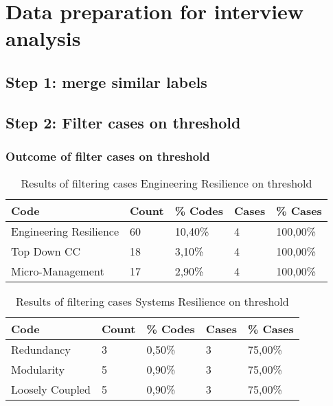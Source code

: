\chapter{Data preparation for interview analysis}

\section{Step 1: merge similar labels}


\section{Step 2: Filter cases on threshold}



\subsection{Outcome of filter cases on threshold}

\begin{table}[H]
	\centering
	\begin{tabular}{lllll}
		\toprule
		\textbf{Code} & \textbf{Count} & \textbf{\% Codes} &\textbf{Cases} & \textbf{\% Cases} \\
		\midrule
		Engineering Resilience & 60    & 10,40\% & 4     & 100,00\% \\
		Top Down CC & 18    & 3,10\% & 4     & 100,00\% \\
		Micro-Management & 17    & 2,90\% & 4     & 100,00\% \\
		\bottomrule
	\end{tabular}%
	\caption{Results of filtering cases Engineering Resilience on threshold}%
	\label{tab:resultsfilteringengineeringresilience}%
\end{table}%

\begin{table}[H]
	\centering
	\begin{tabular}{lllll}
		\toprule
		\textbf{Code} & \textbf{Count} & \textbf{\% Codes} &\textbf{Cases} & \textbf{\% Cases} \\
		\midrule
		Redundancy & 3     & 0,50\% & 3     & 75,00\% \\
		Modularity & 5     & 0,90\% & 3     & 75,00\% \\
		Loosely Coupled & 5     & 0,90\% & 3     & 75,00\% \\
		\bottomrule
	\end{tabular}%
	\caption{Results of filtering cases Systems Resilience on threshold}%
	\label{tab:resultsfilteringsystemsresilience}%
\end{table}%

